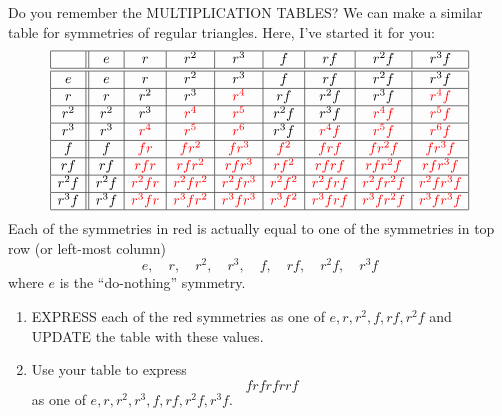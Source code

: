 \documentclass[noauthor,nooutcomes,12pt,hints,handout]{ximera}
\begin{document}
\begin{question}
  Do you remember the MULTIPLICATION TABLES? We can make a similar
  table for symmetries of regular triangles. Here, I've started it for
  you:
  \[
  \begin{array}{|c||c|c|c|c|c|c|c|c|}
    \hline
         & e    & r     & r^2     & r^3      & f      & rf     & r^2f      &  r^3 f\\ \hline\hline
    e    & e    & r     & r^2     & r^3      & f      & rf     & r^2f      &  r^3 f\\ \hline
    r    & r    & r^2   & r^3     & \color{red}r^4      & rf     & r^2f   & r^3f      & \color{red}r^4f\\ \hline
    r^2  & r^2  & r^3   & \color{red}r^4     & \color{red}r^5      & r^2f   & r^3f   & \color{red}r^4f      & \color{red}r^5f\\ \hline
    r^3  & r^3  & \color{red}r^4   & \color{red}r^5     & \color{red}r^6      & r^3f   & \color{red}r^4f   & \color{red}r^5f      & \color{red}r^6f\\ \hline
    f    & f    & \color{red}fr    & \color{red}fr^2    & \color{red}fr^3     & \color{red}f^2    & \color{red}frf    & \color{red}fr^2f     & \color{red}fr^3f\\ \hline
    rf   & rf   & \color{red}rfr   & \color{red}rfr^2   & \color{red}rfr^3    & \color{red}rf^2   & \color{red}rfrf   & \color{red}rfr^2f    & \color{red}rfr^3f\\ \hline
    r^2f & r^2f & \color{red}r^2fr & \color{red}r^2fr^2 & \color{red}r^2fr^3  & \color{red}r^2f^2 & \color{red}r^2frf & \color{red}r^2fr^2f  & \color{red}r^2fr^3f\\ \hline
    r^3f & r^3f & \color{red}r^3fr & \color{red}r^3fr^2 & \color{red}r^3fr^3  & \color{red}r^3f^2 & \color{red}r^3frf & \color{red}r^3f r^2f & \color{red}r^3fr^3f\\ \hline
  \end{array}
  \]
  Each of the symmetries in red is actually equal to one of the
  symmetries in top row (or left-most column)
  \[
  e,\quad r,\quad r^2,\quad r^3,\quad f,\quad rf,\quad r^2f,\quad r^3f
  \]
  where $e$ is the ``do-nothing'' symmetry.
  \begin{enumerate}
    \item EXPRESS each of the red symmetries as one of
      $e,r,r^2,f,rf,r^2f$ and UPDATE the table with these values.
    \item Use your table to express
      \[
      frfrfrrf
      \]
      as one of $e,r,r^2,r^3,f,rf,r^2f, r^3f$.

\end{enumerate}
\end{question}
\end{document}
